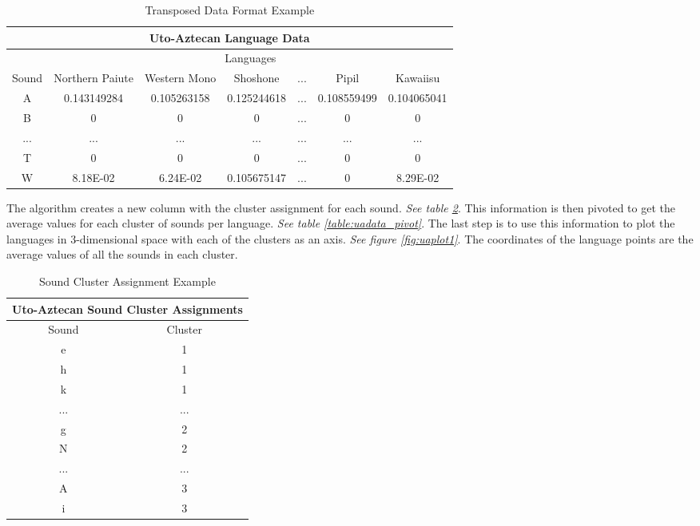 \documentclass{article}
\begin{document}
\begin{table}
\centering
\begin{tabular}{|c| c c c c c c|}
 \hline
 \multicolumn{7}{|c|}{\textbf{Uto-Aztecan Language Data}} \\
 \hline
 &\multicolumn{6}{|c|}{Languages} \\
 \hline
 Sound&Northern Paiute&Western Mono&Shoshone&...&Pipil&Kawaiisu\\
 \hline
 A&0.143149284&0.105263158&0.125244618&...&0.108559499&0.104065041\\
 B&0&0&0&...&0&0\\
 ...&...&...&...&...&...&...\\
 T&0&0&0&...&0&0\\
 W&8.18E-02&6.24E-02&0.105675147&...&0&8.29E-02\\
 \hline
\end{tabular}
\caption{Transposed Data Format Example}
\label{table:uadata_postT}
\end{table}

The algorithm creates a new column with the cluster assignment for each sound. \textit{See table \ref{table:uadata_clust}}. This information is then pivoted to get the average values for each cluster of sounds per language. \textit{See table \ref{table:uadata_pivot}}. The last step is to use this information to plot the languages in 3-dimensional space with each of the clusters as an axis.\cite{plotly} \textit{See figure \ref{fig:uaplot1}}. The coordinates of the language points are the average values of all the sounds in each cluster.

\begin{table}
\centering
\begin{tabular}{|c| c |}
 \hline
 \multicolumn{2}{|c|}{\textbf{Uto-Aztecan Sound Cluster Assignments}} \\
 \hline
 Sound&Cluster\\
 \hline
 e&1\\
 h&1\\
 k&1\\
 ...&...\\
 g&2\\
 N&2\\
 ...&...\\
 A&3\\
 i&3\\
 \hline
\end{tabular}
\caption{Sound Cluster Assignment Example}
\label{table:uadata_clust}
\end{table}
\end{document}
